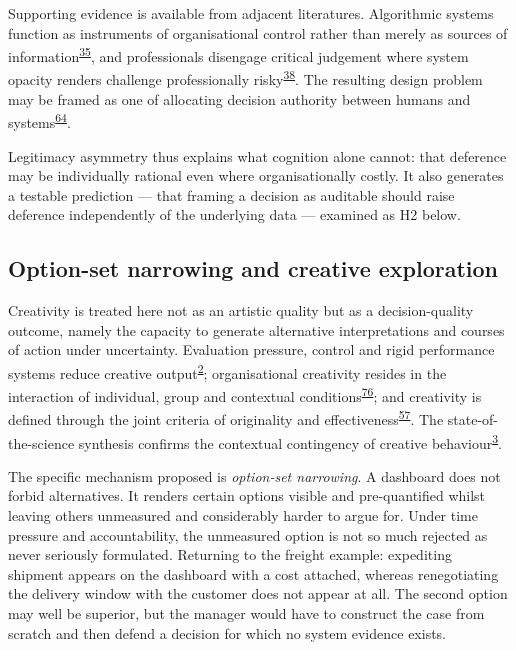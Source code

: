 \documentclass[11pt,a4paper]{article}
\numberwithin{figure}{section}
\numberwithin{table}{section}
\begin{document}
Supporting evidence is available from adjacent literatures. Algorithmic systems function as instruments of
organisational control rather than merely as sources of information\textsuperscript{\hyperlink{ref35}{35}}, and professionals
disengage critical judgement where system opacity renders challenge professionally risky\textsuperscript{\hyperlink{ref38}{38}}.
The resulting design problem may be framed as one of allocating decision authority between humans and
systems\textsuperscript{\hyperlink{ref64}{64}}.

Legitimacy asymmetry thus explains what cognition alone cannot: that deference may be individually rational
even where organisationally costly. It also generates a testable prediction --- that framing a decision as
auditable should raise deference independently of the underlying data --- examined as H2 below.

\subsection{Option-set narrowing and creative exploration}

Creativity is treated here not as an artistic quality but as a decision-quality outcome, namely the
capacity to generate alternative interpretations and courses of action under uncertainty. Evaluation
pressure, control and rigid performance systems reduce creative output\textsuperscript{\hyperlink{ref2}{2}}; organisational
creativity resides in the interaction of individual, group and contextual conditions\textsuperscript{\hyperlink{ref76}{76}}; and
creativity is defined through the joint criteria of originality and effectiveness\textsuperscript{\hyperlink{ref57}{57}}. The
state-of-the-science synthesis confirms the contextual contingency of creative behaviour\textsuperscript{\hyperlink{ref3}{3}}.

The specific mechanism proposed is \emph{option-set narrowing}. A dashboard does not forbid alternatives.
It renders certain options visible and pre-quantified whilst leaving others unmeasured and considerably
harder to argue for. Under time pressure and accountability, the unmeasured option is not so much rejected
as never seriously formulated. Returning to the freight example: expediting shipment appears on the
dashboard with a cost attached, whereas renegotiating the delivery window with the customer does not appear
at all. The second option may well be superior, but the manager would have to construct the case from
scratch and then defend a decision for which no system evidence exists.
\end{document}
